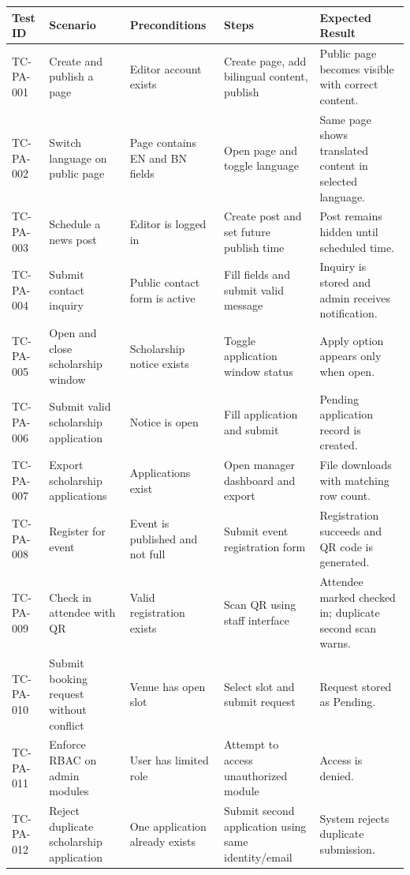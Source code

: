 \documentclass[12pt,a4paper]{article}
\newcommand{\thead}[1]{\textbf{\color{white}#1}}
\newcommand{\theadrow}{\rowcolor{headerblue}}
\begin{document}
\begin{longtable}{@{}L{1.5cm}L{2.6cm}L{2.7cm}L{3.1cm}L{4.5cm}@{}}
\theadrow \thead{Test ID} & \thead{Scenario} & \thead{Preconditions} & \thead{Steps} & \thead{Expected Result} \\
\endhead
TC-PA-001 & Create and publish a page & Editor account exists & Create page, add bilingual content, publish & Public page becomes visible with correct content. \\
TC-PA-002 & Switch language on public page & Page contains EN and BN fields & Open page and toggle language & Same page shows translated content in selected language. \\
TC-PA-003 & Schedule a news post & Editor is logged in & Create post and set future publish time & Post remains hidden until scheduled time. \\
TC-PA-004 & Submit contact inquiry & Public contact form is active & Fill fields and submit valid message & Inquiry is stored and admin receives notification. \\
TC-PA-005 & Open and close scholarship window & Scholarship notice exists & Toggle application window status & Apply option appears only when open. \\
TC-PA-006 & Submit valid scholarship application & Notice is open & Fill application and submit & Pending application record is created. \\
TC-PA-007 & Export scholarship applications & Applications exist & Open manager dashboard and export & File downloads with matching row count. \\
TC-PA-008 & Register for event & Event is published and not full & Submit event registration form & Registration succeeds and QR code is generated. \\
TC-PA-009 & Check in attendee with QR & Valid registration exists & Scan QR using staff interface & Attendee marked checked in; duplicate second scan warns. \\
TC-PA-010 & Submit booking request without conflict & Venue has open slot & Select slot and submit request & Request stored as Pending. \\
TC-PA-011 & Enforce RBAC on admin modules & User has limited role & Attempt to access unauthorized module & Access is denied. \\
TC-PA-012 & Reject duplicate scholarship application & One application already exists & Submit second application using same identity/email & System rejects duplicate submission. \\

\end{longtable}
\end{document}
